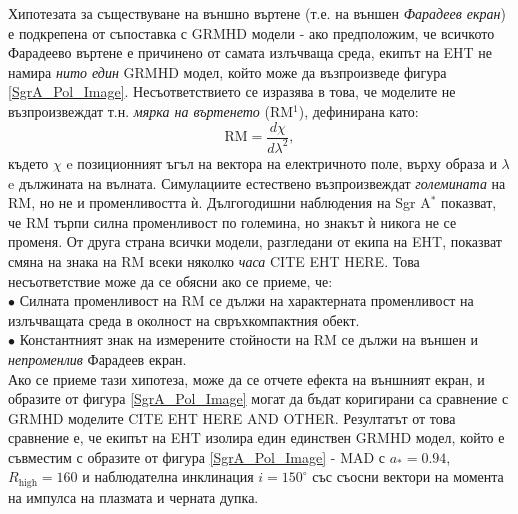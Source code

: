 Хипотезата за съществуване на външно въртене (т.е. на външен \emph{Фарадеев екран}) е подкрепена от съпоставка с GRMHD модели - ако предположим, че всичкото Фарадеево въртене е причинено от самата излъчваща среда, екипът на EHT не намира \emph{нито един} GRMHD модел, който може да възпроизведе фигура \ref{SgrA_Pol_Image}. Несъответствието се изразява в това, че моделите не възпроизвеждат т.н. \emph{мярка на въртенето} (RM$^1$), дефинирана като:
\begin{equation}
	\text{RM} = \frac{d\chi}{d\lambda^2},
\end{equation}
където $\chi$ e позиционният ъгъл на вектора на електричното поле, върху образа и $\lambda$ e дължината на вълната. Симулациите естествено възпроизвеждат \emph{големината} на RM, но не и променливостта ѝ. Дългогодишни наблюдения на Sgr A$^*$ показват, че RM търпи силна променливост по големина, но знакът ѝ никога не се променя. От друга страна всички модели, разгледани от екипа на EHT, показват смяна на знака на RM всеки няколко \emph{часа} CITE EHT HERE. Това несъответствие може да се обясни ако се приеме, че:\\\newline
$\bullet$ Силната променливост на RM се дължи на характерната променливост на излъчващата среда в околност на свръхкомпактния обект.\\\newline
$\bullet$ Константният знак на измерените стойности на RM се дължи на външен и \emph{непроменлив} Фарадеев екран.\\

Ако се приеме тази хипотеза, може да се отчете ефекта на външният екран, и образите от фигура \ref{SgrA_Pol_Image} могат да бъдат коригирани са сравнение с GRMHD моделите CITE EHT HERE AND OTHER. Резултатът от това сравнение е, че екипът на EHT изолира един единствен GRMHD модел, който е съвместим с образите от фигура \ref{SgrA_Pol_Image} - MAD с $a_* = 0.94$, $R_\text{high} = 160$ и наблюдателна инклинация $i = 150^\circ$ със съосни вектори на момента на импулса на плазмата и черната дупка.
 \setlength{\footskip}{0pt}
